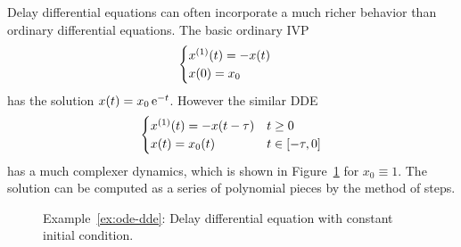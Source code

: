     \begin{example}\label{ex:ode-dde}
        Delay differential equations can often incorporate a much richer behavior than ordinary differential equations.
        The basic ordinary IVP
        \begin{equation*}
            \begin{cases}
                \D{x}(t) = -x(t)\\
                x(0) = x_0
            \end{cases}
        \end{equation*}
        has the solution $x(t)=x_0 \operatorname{e}^{-t}$. However the similar DDE
        \begin{equation*}
            \begin{cases}
                \D{x}(t) = -x(t-\tau) & t\geq 0\\
                x(t) = x_0(t) & t\in\compactum{-\tau}{0}
            \end{cases}
        \end{equation*}
        has a much complexer dynamics, which is shown in Figure~\ref{fig:plot-ex-dde} for $x_0\equiv 1$. The solution can be computed as a series of polynomial pieces by the method of steps.
    \end{example}

    \begin{figure}[b]
        \centering
        
    	\caption{Example~\ref{ex:ode-dde}: Delay differential equation with constant initial condition.}
    	\label{fig:plot-ex-dde}
    \end{figure}
